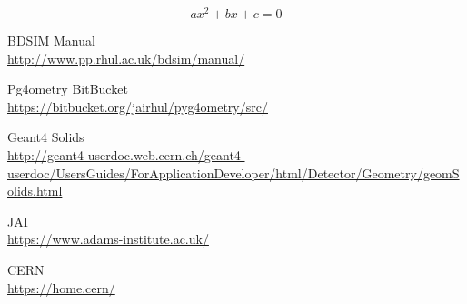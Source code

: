 \documentclass[12pt,a4paper]{article}
\begin{document}
\begin{equation}
ax^2 + bx + c = 0
\end{equation}

\small




\newpage
\begin{thebibliography}{1}
	\bibitem{}
		BDSIM Manual\\
		\url{http://www.pp.rhul.ac.uk/bdsim/manual/}
		
	\bibitem{}
		Pg4ometry BitBucket\\
		\url{https://bitbucket.org/jairhul/pyg4ometry/src/}
		
	\bibitem{}
	Geant4 Solids\\
	\url{http://geant4-userdoc.web.cern.ch/geant4-userdoc/UsersGuides/ForApplicationDeveloper/html/Detector/Geometry/geomSolids.html}
	
	JAI\\
	\url{https://www.adams-institute.ac.uk/}
	
	CERN\\
	\url{https://home.cern/}
		
		

\end{thebibliography}
\end{document}
